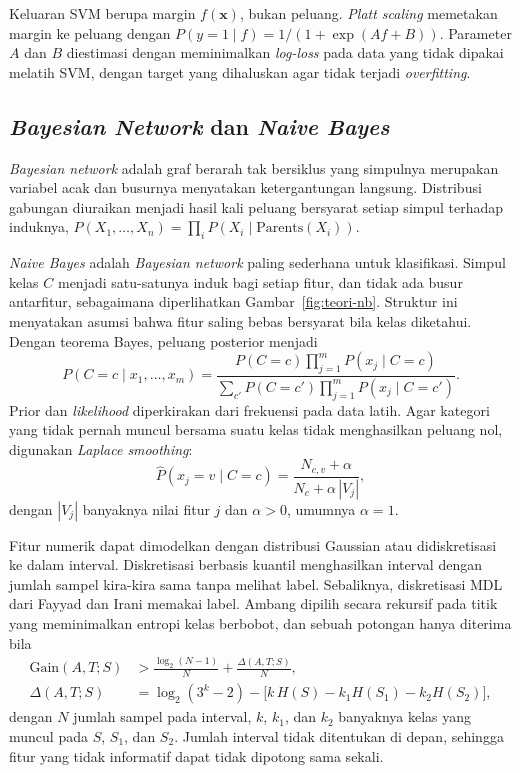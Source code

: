Keluaran SVM berupa margin $f(\mathbf{x})$, bukan peluang. \textit{Platt scaling} memetakan margin ke peluang dengan $P(y=1\mid f)=1/(1+\exp(Af+B))$. Parameter $A$ dan $B$ diestimasi dengan meminimalkan \textit{log-loss} pada data yang tidak dipakai melatih SVM, dengan target yang dihaluskan agar tidak terjadi \textit{overfitting}.

\subsection{\textit{Bayesian Network} dan \textit{Naive Bayes}}
\textit{Bayesian network} adalah graf berarah tak bersiklus yang simpulnya merupakan variabel acak dan busurnya menyatakan ketergantungan langsung. Distribusi gabungan diuraikan menjadi hasil kali peluang bersyarat setiap simpul terhadap induknya, $P(X_1,\dots,X_n)=\prod_i P(X_i\mid\mathrm{Parents}(X_i))$.

\textit{Naive Bayes} adalah \textit{Bayesian network} paling sederhana untuk klasifikasi. Simpul kelas $C$ menjadi satu-satunya induk bagi setiap fitur, dan tidak ada busur antarfitur, sebagaimana diperlihatkan Gambar~\ref{fig:teori-nb}. Struktur ini menyatakan asumsi bahwa fitur saling bebas bersyarat bila kelas diketahui. Dengan teorema Bayes, peluang posterior menjadi
\begin{equation}
    P(C=c\mid x_1,\dots,x_m)=\frac{P(C=c)\prod_{j=1}^{m}P(x_j\mid C=c)}{\sum_{c'}P(C=c')\prod_{j=1}^{m}P(x_j\mid C=c')}.
    \label{eq:nb}
\end{equation}
Prior dan \textit{likelihood} diperkirakan dari frekuensi pada data latih. Agar kategori yang tidak pernah muncul bersama suatu kelas tidak menghasilkan peluang nol, digunakan \textit{Laplace smoothing}:
\begin{equation}
    \hat{P}(x_j=v\mid C=c)=\frac{N_{c,v}+\alpha}{N_c+\alpha\,|V_j|},
    \label{eq:laplace}
\end{equation}
dengan $|V_j|$ banyaknya nilai fitur $j$ dan $\alpha>0$, umumnya $\alpha=1$.

Fitur numerik dapat dimodelkan dengan distribusi Gaussian atau didiskretisasi ke dalam interval. Diskretisasi berbasis kuantil menghasilkan interval dengan jumlah sampel kira-kira sama tanpa melihat label. Sebaliknya, diskretisasi MDL dari Fayyad dan Irani memakai label. Ambang dipilih secara rekursif pada titik yang meminimalkan entropi kelas berbobot, dan sebuah potongan hanya diterima bila
\begin{equation}
    \begin{aligned}
    \mathrm{Gain}(A,T;S)&>\frac{\log_2(N-1)}{N}+\frac{\Delta(A,T;S)}{N},\\
    \Delta(A,T;S)&=\log_2(3^k-2)-\bigl[k\,H(S)-k_1H(S_1)-k_2H(S_2)\bigr],
    \end{aligned}
    \label{eq:fayyad}
\end{equation}
dengan $N$ jumlah sampel pada interval, $k$, $k_1$, dan $k_2$ banyaknya kelas yang muncul pada $S$, $S_1$, dan $S_2$. Jumlah interval tidak ditentukan di depan, sehingga fitur yang tidak informatif dapat tidak dipotong sama sekali.

